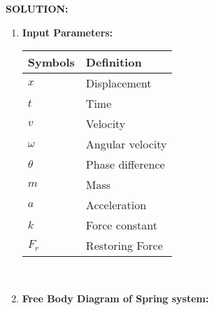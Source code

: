 \documentclass[journal,12pt,twocolumn]{IEEEtran}
\theoremstyle{remark}
\begin{document}
\textbf{SOLUTION:}\\
\begin{enumerate}
\item \textbf{Input Parameters:}
\begin{table}[h]
\begin{tabular}{|l|l|}
\hline
\textbf{Symbols} & \textbf{Definition}\\ \hline
$x$ & Displacement \\ \hline
$t$ & Time \\ \hline
$v$ & Velocity\\ \hline
$\omega$ & Angular velocity   \\ \hline
$\theta$ & Phase difference\\ \hline
$m$ & Mass\\ \hline
$a$ & Acceleration\\ \hline
$k$ & Force constant\\ \hline
$F_r$ & Restoring Force\\ \hline
\end{tabular}
\end{table}\\
\item \textbf{Free Body Diagram of Spring system:}
\end{enumerate}
\end{document}
